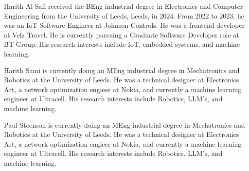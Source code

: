\documentclass{ieeeaccess}
\begin{document}
\begin{IEEEbiography}{Harith Al-Safi} received the BEng industrial degree in Electronics and Computer Engineering from the University of Leeds, Leeds, in 2024. From 2022 to 2023, he was an IoT Software Engineer at Johnson Controls. He was a frontend developer at Velz Travel. He is currently pursuing a Graduate Software Developer role at BT Group. His research interests include IoT, embedded systems, and machine learning.
\end{IEEEbiography}

\begin{IEEEbiography}{Harith Sami} is currently doing an MEng industrial degree in Mechatronics and Robotics at the University of Leeds. He was a technical designer at Electronics Art, a network optimization engieer at Nokia, and currently a machine learning engineer at Ultracell. His research interests include Robotics, LLM's, and machine learning.
\end{IEEEbiography}

\begin{IEEEbiography}{Paul Steenson} is currently doing an MEng industrial degree in Mechatronics and Robotics at the University of Leeds. He was a technical designer at Electronics Art, a network optimization engieer at Nokia, and currently a machine learning engineer at Ultracell. His research interests include Robotics, LLM's, and machine learning.
\end{IEEEbiography}
\end{document}
